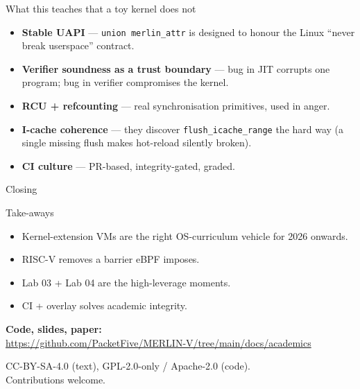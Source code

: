 \documentclass[aspectratio=169,11pt]{beamer}
\begin{document}
\begin{frame}{What this teaches that a toy kernel does not}

\begin{itemize}
  \item \textbf{Stable UAPI} — \texttt{union merlin\_attr} is
        designed to honour the Linux ``never break userspace''
        contract.
  \item \textbf{Verifier soundness as a trust boundary} ---
        bug in JIT corrupts one program; bug in verifier
        compromises the kernel.
  \item \textbf{RCU + refcounting} — real synchronisation
        primitives, used in anger.
  \item \textbf{I-cache coherence} — they discover
        \texttt{flush\_icache\_range} the hard way (a single
        missing flush makes hot-reload silently broken).
  \item \textbf{CI culture} — PR-based, integrity-gated,
        graded.
\end{itemize}

\end{frame}

\begin{frame}{Closing}

\begin{block}{Take-aways}
  \begin{itemize}
    \item Kernel-extension VMs are the right OS-curriculum
          vehicle for 2026 onwards.
    \item RISC-V removes a barrier eBPF imposes.
    \item Lab 03 + Lab 04 are the high-leverage moments.
    \item CI + overlay solves academic integrity.
  \end{itemize}
\end{block}

\pause

\textbf{Code, slides, paper:}\\
\url{https://github.com/PacketFive/MERLIN-V/tree/main/docs/academics}

\medskip
CC-BY-SA-4.0 (text), GPL-2.0-only / Apache-2.0 (code).\\
Contributions welcome.

\end{frame}
\end{document}
